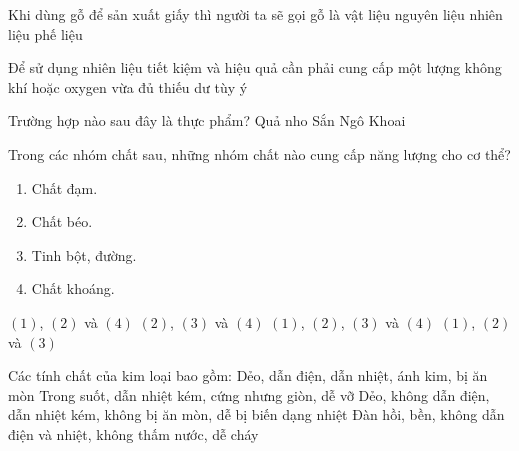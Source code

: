 \documentclass[Main.tex]{subfiles}
\begin{document}
\begin{ex}%
	Khi dùng gỗ để sản xuất giấy thì người ta sẽ gọi gỗ là
	\choice
	{vật liệu}
	{\True nguyên liệu}
	{nhiên liệu}
	{phế liệu}
\end{ex}

\begin{ex}%
	Để sử dụng nhiên liệu tiết kiệm và hiệu quả cần phải cung cấp một lượng không khí hoặc oxygen
	\choice
	{\True vừa đủ}
	{thiếu}
	{dư}
	{tùy ý}
\end{ex}

\begin{ex}%
	Trường hợp nào sau đây là thực phẩm?
	\choice
	{\True Quả nho}
	{Sắn}
	{Ngô}
	{Khoai}
\end{ex}

\begin{ex}%
	Trong các nhóm chất sau, những nhóm chất nào cung cấp năng lượng cho cơ thể?
	\begin{enumerate}[(1)]
		\item Chất đạm.
		\item Chất béo.
		\item Tinh bột, đường.
		\item Chất khoáng.
	\end{enumerate}
	\choice
	{$(1)$, $(2)$ và $(4)$}
	{$(2)$, $(3)$ và $(4)$}
	{$(1)$, $(2)$, $(3)$ và $(4)$}
	{\True $(1)$, $(2)$ và $(3)$}
\end{ex}

\begin{ex}%
	Các tính chất của kim loại bao gồm:
	\choice
	{\True Dẻo, dẫn điện, dẫn nhiệt, ánh kim, bị ăn mòn}
	{Trong suốt, dẫn nhiệt kém, cứng nhưng giòn, dễ vỡ}
	{Dẻo, không dẫn điện, dẫn nhiệt kém, không bị ăn mòn, dễ bị biến dạng nhiệt}
	{Đàn hồi, bền, không dẫn điện và nhiệt, không thấm nước, dễ cháy}
\end{ex}
\end{document}
